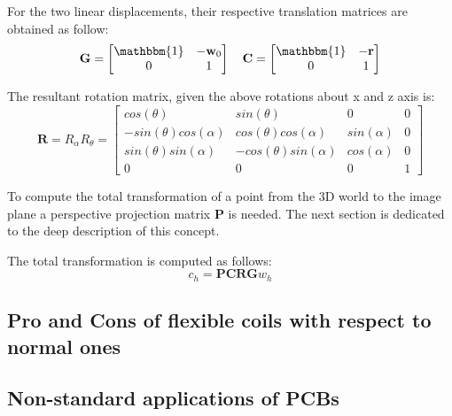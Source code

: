 For the two linear displacements, their respective translation matrices are obtained as follow:
\begin{equation}
    \textbf{G} = 
    \begin{bmatrix}
    \mathbbm{1} & -\textbf{w}_0\\
    0 & 1\\
    \end{bmatrix}
    \quad 
    \textbf{C} = 
    \begin{bmatrix}
    \mathbbm{1} & -\textbf{r}\\
    0 & 1\\
    \end{bmatrix}
\end{equation}

The resultant rotation matrix, given the above rotations about x and z axis is:
\begin{equation}
    \textbf{R} = R_\alpha R_\theta = 
    \begin{bmatrix}
    cos(\theta) & sin(\theta) & 0 & 0\\
    -sin(\theta)cos(\alpha) & cos(\theta)cos(\alpha) & sin(\alpha) & 0\\
    sin(\theta)sin(\alpha) & -cos(\theta)sin(\alpha) & cos(\alpha) & 0\\
    0 & 0 & 0 & 1
    \end{bmatrix}
\end{equation}

To compute the total transformation of a point from the 3D world to the image plane a perspective projection matrix $\textbf{P}$ is needed. The next section is dedicated to the deep description of this concept.

The total transformation is computed as follows:
\begin{equation}
    c_h = \textbf{PCRG}w_h
\end{equation}

\subsection{Pro and Cons of flexible coils with respect to normal ones}

\subsection{Non-standard applications of PCBs}


